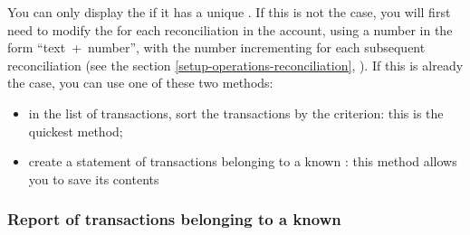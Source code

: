You can only display the  if it has a unique . If this is not the case, you will first need to modify the  for each reconciliation in the account, using a number in the form \enquote{text~+~number}, with the number incrementing for each subsequent reconciliation (see the section \vref{setup-operations-reconciliation}, ). If this is already the case, you can use one of these two methods:
\begin{itemize}
	\item in the list of transactions, sort the transactions by the  criterion: this is the quickest method;
	\item create a statement of transactions belonging to a known : this method allows you to save its contents
\end{itemize}


\subsubsection{Report of transactions belonging to a known \label{reconciliation-manage-content-report}}


